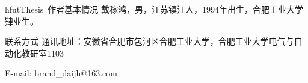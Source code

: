 
\begin{resume}

\begin{resumesection}{hfutThesis~作者基本情况}
戴稼鸿，男，江苏镇江人，1994年出生，合肥工业大学肄业生。
\end{resumesection}

\begin{resumelist}{联系方式}
通讯地址：安徽省合肥市包河区合肥工业大学，合肥工业大学电气与自动化教研室1103

E-mail: brand_daijh@163.com
\end{resumelist}

\end{resume}
